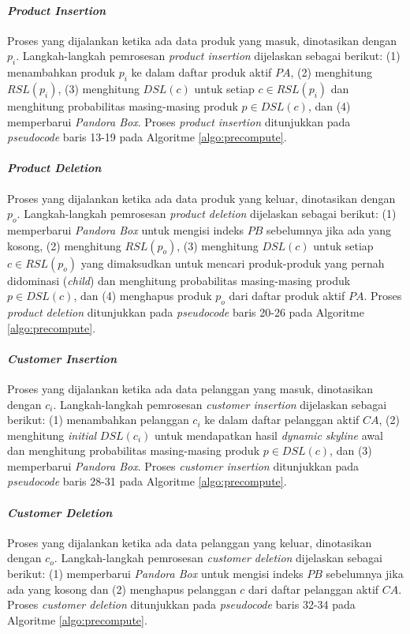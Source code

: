 \documentclass[conference]{IEEEtran}
\begin{document}
\paragraph{\textbf{\textit{Product Insertion}}}
Proses yang dijalankan ketika ada data produk yang masuk, dinotasikan dengan $p_{i}$. Langkah-langkah pemrosesan \textit{product insertion} dijelaskan sebagai berikut: (1) menambahkan produk $p_{i}$ ke dalam daftar produk aktif $PA$, (2) menghitung $RSL(p_{i})$, (3) menghitung $DSL(c)$ untuk setiap $c \in RSL(p_{i})$ dan menghitung probabilitas masing-masing produk $p \in DSL(c)$, dan (4) memperbarui \textit{Pandora Box}. Proses \textit{product insertion} ditunjukkan pada \textit{pseudocode} baris 13-19 pada Algoritme \ref{algo:precompute}.

\paragraph{\textbf{\textit{Product Deletion}}}
Proses yang dijalankan ketika ada data produk yang keluar, dinotasikan dengan $p_{o}$. Langkah-langkah pemrosesan \textit{product deletion} dijelaskan sebagai berikut: (1) memperbarui \textit{Pandora Box} untuk mengisi indeks $PB$ sebelumnya jika ada yang kosong, (2) menghitung $RSL(p_{o})$, (3) menghitung $DSL(c)$ untuk setiap $c \in RSL(p_{o})$ yang dimaksudkan untuk mencari produk-produk yang pernah didominasi (\textit{child}) dan menghitung probabilitas masing-masing produk $p \in DSL(c)$, dan (4) menghapus produk $p_{o}$ dari daftar produk aktif $PA$. Proses \textit{product deletion} ditunjukkan pada \textit{pseudocode} baris 20-26 pada Algoritme \ref{algo:precompute}.

\paragraph{\textbf{\textit{Customer Insertion}}}
Proses yang dijalankan ketika ada data pelanggan yang masuk, dinotasikan dengan $c_{i}$. Langkah-langkah pemrosesan \textit{customer insertion} dijelaskan sebagai berikut: (1) menambahkan pelanggan $c_{i}$ ke dalam daftar pelanggan aktif $CA$, (2) menghitung \textit{initial} $DSL(c_{i})$ untuk mendapatkan hasil \textit{dynamic skyline} awal dan menghitung probabilitas masing-masing produk $p \in DSL(c)$, dan (3) memperbarui \textit{Pandora Box}. Proses \textit{customer insertion} ditunjukkan pada \textit{pseudocode} baris 28-31 pada Algoritme \ref{algo:precompute}.

\paragraph{\textbf{\textit{Customer Deletion}}}
Proses yang dijalankan ketika ada data pelanggan yang keluar, dinotasikan dengan $c_{o}$. Langkah-langkah pemrosesan \textit{customer deletion} dijelaskan sebagai berikut: (1) memperbarui \textit{Pandora Box} untuk mengisi indeks $PB$ sebelumnya jika ada yang kosong dan (2) menghapus pelanggan $c$ dari daftar pelanggan aktif $CA$. Proses \textit{customer deletion} ditunjukkan pada \textit{pseudocode} baris 32-34 pada Algoritme \ref{algo:precompute}.
\end{document}
